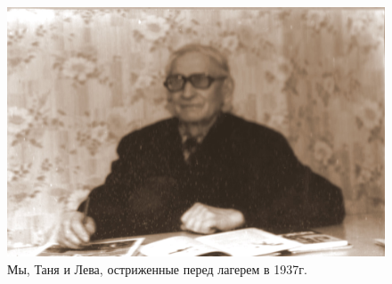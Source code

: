 \documentclass[utf8x, 10pt]{G7-32} %
\begin{document}
\vfill
\vspace{-20pt}
\begin{figure}[h!]

    \begin{minipage}[h!]{40mm}
        \vspace{-10pt}
        \caption{Мы, Таня и Лева, остриженные перед лагерем в 1937г.}
    \end{minipage}
    \hfill
   \begin{minipage}[h]{90mm}
       \includegraphics[width=\linewidth]{inc/Menshekovy/22.jpg} 

\end{minipage}
\end{figure}
\end{document}
